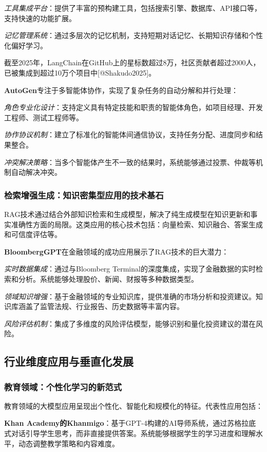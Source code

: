 \documentclass{article}
\begin{document}
\textit{工具集成平台}：提供了丰富的预构建工具，包括搜索引擎、数据库、API接口等，支持快速的功能扩展。

\textit{记忆管理系统}：通过多层次的记忆机制，支持短期对话记忆、长期知识存储和个性化偏好学习。

截至2025年，LangChain在GitHub上的星标数超过8万，社区贡献者超过2000人，已被集成到超过10万个项目中[@Shakudo2025]。

\textbf{AutoGen}专注于多智能体协作，实现了复杂任务的自动分解和并行处理：

\textit{角色专业化设计}：支持定义具有特定技能和职责的智能体角色，如项目经理、开发工程师、测试工程师等。

\textit{协作协议机制}：建立了标准化的智能体间通信协议，支持任务分配、进度同步和结果整合。

\textit{冲突解决策略}：当多个智能体产生不一致的结果时，系统能够通过投票、仲裁等机制自动解决冲突。

\subsubsection{检索增强生成：知识密集型应用的技术基石}
RAG技术通过结合外部知识检索和生成模型，解决了纯生成模型在知识更新和事实准确性方面的局限。这类应用的核心技术包括：向量检索、知识融合、答案生成和可信度评估等。

\textbf{BloombergGPT}在金融领域的成功应用展示了RAG技术的巨大潜力：

\textit{实时数据集成}：通过与Bloomberg Terminal的深度集成，实现了金融数据的实时检索和分析。系统能够处理股价、新闻、财报等多种数据类型。

\textit{领域知识增强}：基于金融领域的专业知识库，提供准确的市场分析和投资建议。知识库涵盖了监管法规、行业报告、历史数据等丰富内容。

\textit{风险评估机制}：集成了多维度的风险评估模型，能够识别和量化投资建议的潜在风险。

\subsection{行业维度应用与垂直化发展}

\subsubsection{教育领域：个性化学习的新范式}
教育领域的大模型应用呈现出个性化、智能化和规模化的特征。代表性应用包括：

\textbf{Khan Academy的Khanmigo}：基于GPT-4构建的AI导师系统，通过苏格拉底式对话引导学生思考，而非直接提供答案。系统能够根据学生的学习进度和理解水平，动态调整教学策略和内容难度。
\end{document}
